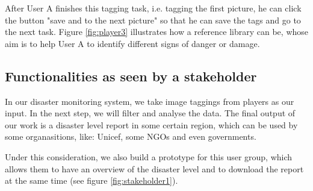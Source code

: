       After User A finishes this tagging task,
      i.e.
      tagging the first picture,
      he can click the button "save and to the next picture" so that he can save the tags and go to the next task.
      Figure \ref{fig:player3} illustrates how a reference library can be,
      whose aim is to help User A to identify different signs of danger or damage.

    \subsection{Functionalities as seen by a stakeholder}
      In our disaster monitoring system, 
      we take image taggings from players as our input. 
      In the next step, 
      we will filter and analyse the data.
      The final output of our work is a disaster level report in some certain region,
      which can be used by some organasitions,
      like: Unicef, some NGOs and even governments.

      Under this consideration, 
      we also build a prototype for this user group,
      which allows them to have an overview of the disaster level and to download the report at the same time (see figure \ref{fig:stakeholder1}).

